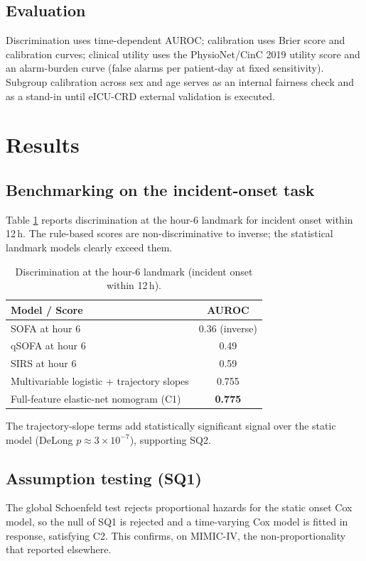\documentclass[conference]{IEEEtran}
\begin{document}
\subsection{Evaluation}
Discrimination uses time-dependent AUROC; calibration uses Brier score and
calibration curves; clinical utility uses the PhysioNet/CinC 2019 utility score
\cite{reyna2020physionet} and an alarm-burden curve (false alarms per
patient-day at fixed sensitivity). Subgroup calibration across sex and age
serves as an internal fairness check and as a stand-in until eICU-CRD external
validation is executed.

\section{Results}
\label{sec:results}

\subsection{Benchmarking on the incident-onset task}
Table \ref{tab:bench} reports discrimination at the hour-6 landmark for
incident onset within 12\,h. The rule-based scores are non-discriminative to
inverse; the statistical landmark models clearly exceed them.

\begin{table}[t]
\caption{Discrimination at the hour-6 landmark (incident onset within 12\,h).}
\label{tab:bench}
\centering
\begin{tabular}{lc}
\toprule
\textbf{Model / Score} & \textbf{AUROC} \\
\midrule
SOFA at hour 6                              & 0.36 (inverse) \\
qSOFA at hour 6                             & 0.49 \\
SIRS at hour 6                              & 0.59 \\
Multivariable logistic + trajectory slopes & 0.755 \\
Full-feature elastic-net nomogram (C1)     & \textbf{0.775} \\
\bottomrule
\end{tabular}
\end{table}

The trajectory-slope terms add statistically significant signal over the
static model (DeLong $p \approx 3\times10^{-7}$), supporting SQ2.

\subsection{Assumption testing (SQ1)}
The global Schoenfeld test rejects proportional hazards for the static onset
Cox model, so the null of SQ1 is rejected and a time-varying Cox model is
fitted in response, satisfying C2. This confirms, on MIMIC-IV, the
non-proportionality that \textcite{kasal2004cox} reported
elsewhere.
\end{document}
